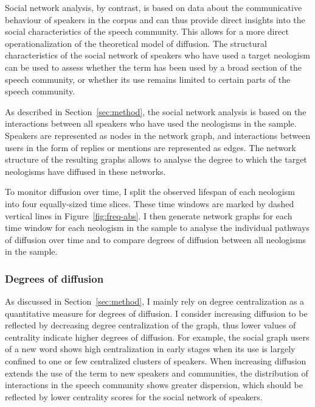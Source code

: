 \documentclass[
  a4paper,
  abstract=on,
  captions=tableabove
  ]{scrartcl}
\begin{document}
    Social network analysis, by contrast, is based on data about the communicative behaviour of speakers in the corpus and can thus provide direct insights into the social characteristics of the speech community. This allows for a more direct operationalization of the theoretical model of diffusion. The structural characteristics of the social network of speakers who have used a target neologism can be used to assess whether the term has been used by a broad section of the speech community, or whether its use remains limited to certain parts of the speech community.

    As described in Section~\ref{sec:method}, the social network analysis is based on the interactions between all speakers who have used the neologisms in the sample. Speakers are represented as nodes in the network graph, and interactions between users in the form of replies or mentions are represented as edges. The network structure of the resulting graphs allows to analyse the degree to which the target neologisms have diffused in these networks.

    To monitor diffusion over time, I split the observed lifespan of each neologism into four equally-sized time slices. These time windows are marked by dashed vertical lines in Figure~\ref{fig:freq-abs}. I then generate network graphs for each time window for each neologism in the sample to analyse the individual pathways of diffusion over time and to compare degrees of diffusion between all neologisms in the sample.

    \subsubsection{Degrees of diffusion}
      \label{subsec:degrees-of-diffusion}

      As discussed in Section~\ref{sec:method}, I mainly rely on degree centralization as a quantitative measure for degrees of diffusion. I consider increasing diffusion to be reflected by decreasing degree centralization of the graph, thus lower values of centrality indicate higher degrees of diffusion. For example, the social graph users of a new word shows high centralization in early stages when its use is largely confined to one or few centralized clusters of speakers. When increasing diffusion extends the use of the term to new speakers and communities, the distribution of interactions in the speech community shows greater dispersion, which should be reflected by lower centrality scores for the social network of speakers.
\end{document}
